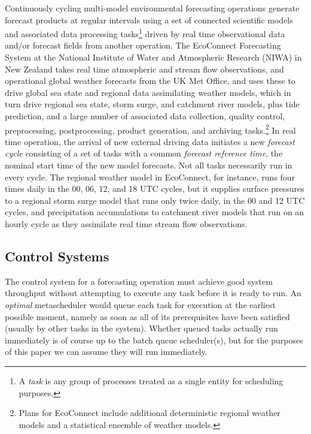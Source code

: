 \documentclass[11pt,a4paper]{article}
\begin{document}
Continuously cycling multi-model environmental forecasting operations
generate forecast products at regular intervals using a set of connected
scientific models and associated data processing tasks\footnote{A {\em
task} is any group of processes treated as a single entity for
scheduling purposes.} driven by real time observational data and/or
forecast fields from another operation.  The EcoConnect Forecasting
System at the National Institute of Water and Atmospheric Research
(NIWA) in New Zealand takes real time atmospheric and stream flow
observations, and operational global weather forecasts from the UK Met
Office, and uses these to drive global sea state and regional data
assimilating weather models, which in turn drive regional sea state,
storm surge, and catchment river models, plus tide prediction, and a
large number of associated data collection, quality control,
preprocessing, postprocessing, product generation, and archiving
tasks.\footnote{Plans for EcoConnect include additional deterministic
regional weather models and a statistical ensemble of weather models.}
In real time operation, the arrival of new external driving data
initiates a new {\em forecast cycle} consisting of a set of tasks with
a common {\em forecast reference time}, the nominal start time of the
new model forecasts. Not all tasks necessarily run in every cycle. The
regional weather model in EcoConnect, for instance, runs four times
daily in the 00, 06, 12, and 18 UTC cycles, but it supplies surface
pressures to a regional storm surge model that runs only twice daily, in
the 00 and 12 UTC cycles, and precipitation accumulations to catchment
river models that run on an hourly cycle as they assimilate real time
stream flow observations. 

\subsection{Control Systems}

The control system for a forecasting operation must achieve good system
throughput without attempting to execute any task before it is ready to
run.  An {\em optimal} metascheduler would queue each task for execution
at the earliest possible moment, namely as soon as all of its
prerequisites have been satisfied (usually by other tasks in the
system). Whether queued tasks actually run immediately is of course up
to the batch queue scheduler(s), but for the purposes of this paper we
can assume they will run immediately. 
\end{document}
